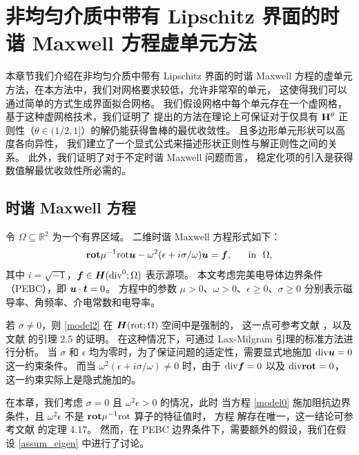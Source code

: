 \chapter{非均匀介质中带有 Lipschitz 界面的时谐 Maxwell 方程虚单元方法}
本章节我们介绍在非均匀介质中带有
Lipschitz 界面的时谐 Maxwell
方程的虚单元方法，在本方法中，我们对网格要求较低，允许非常窄的单元，
这使得我们可以通过简单的方式生成界面拟合网格。
我们假设网格中每个单元存在一个虚网格，基于这种虚网格技术，我们证明了
提出的方法在理论上可保证对于仅具有 $\mathbf{H}^{\theta}$
正则性（$\theta\in(1/2,1]$）的解仍能获得鲁棒的最优收敛性。
且多边形单元形状可以高度各向异性，
我们建立了一个显式公式来描述形状正则性与解正则性之间的关系。
此外，我们证明了对于不定时谐 Maxwell 问题而言，
稳定化项的引入是获得数值解最优收敛性所必需的。

\section{时谐 Maxwell 方程}
令 $\Omega \subseteq \mathbb{R}^2$ 为一个有界区域。
二维时谐 Maxwell 方程形式如下：
\begin{equation}
\label{model0}
\mathbf{rot} \mu^{-1} \mathrm{rot} \boldsymbol{u} - \omega^2(\epsilon + i \sigma/\omega) \boldsymbol{u} = \boldsymbol{f}, ~~~~ \text{ in } ~ \Omega,
\end{equation}
其中 $i = \sqrt{-1}$，$\boldsymbol{f} \in \boldsymbol{H}(\mathrm{div}^0;\Omega)$ 表示源项。
本文考虑完美电导体边界条件（PEBC），即 $\boldsymbol{u}\cdot\boldsymbol{t} = 0$。
方程中的参数 $\mu > 0$、$\omega > 0$、$\epsilon \geq 0$、$\sigma \geq 0$
分别表示磁导率、角频率、介电常数和电导率。

若 $\sigma \neq 0$，则 \eqref{model2} 在 $\boldsymbol{H}(\mathrm{rot};\Omega)$ 空间中是强制的，
这一点可参考文献 \cite{1992Monk,2003GopalakrishnanPasciak}，以及文献 \cite{2019BonazzoliDoleanGrahamSpenceTournier} 的引理 2.5 的证明。
在这种情况下，可通过 Lax-Milgram 引理的标准方法进行分析。
当 $\sigma$ 和 $\epsilon$ 均为零时，为了保证问题的适定性，需要显式地施加 $\mathrm{div} \boldsymbol{u} = 0$ 这一约束条件。
而当 $\omega^2(\epsilon + i \sigma/\omega)\neq 0$ 时，由于 $\mathrm{div}\boldsymbol{f} = 0$ 以及 $\mathrm{div}\mathbf{rot} = 0$，这一约束实际上是隐式施加的。

在本章，我们考虑 $\sigma = 0$ 且 $\omega^2 \epsilon > 0$ 的情况，此时
当方程 \eqref{model0} 施加阻抗边界条件，且 $\omega^2\epsilon$ 不是
$\mathbf{rot}\mu^{-1}\mathrm{rot}$ 算子的特征值时，
方程
解存在唯一，这一结论可参考文献 \cite{2003Monk} 的定理 4.17。
然而，在 PEBC 边界条件下，需要额外的假设，我们在假设 \ref{assum_eigen} 中进行了讨论。

